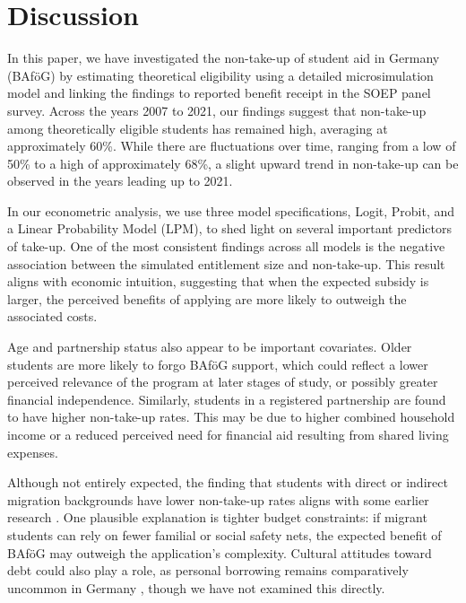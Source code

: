 \section{Discussion}

In this paper, we have investigated the non-take-up of student aid in Germany (BAföG) by estimating theoretical eligibility using a detailed microsimulation model and linking the findings to reported benefit receipt in the SOEP panel survey. Across the years 2007 to 2021, our findings suggest that non-take-up among theoretically eligible students has remained high, averaging at approximately 60\%. While there are fluctuations over time, ranging from a low of 50\% to a high of approximately 68\%, a slight upward trend in non-take-up can be observed in the years leading up to 2021.

In our econometric analysis, we use three model specifications, Logit, Probit, and a Linear Probability Model (LPM), to shed light on several important predictors of take-up. One of the most consistent findings across all models is the negative association between the simulated entitlement size and non-take-up. This result aligns with economic intuition, suggesting that when the expected subsidy is larger, the perceived benefits of applying are more likely to outweigh the associated costs.

Age and partnership status also appear to be important covariates. 
Older students are more likely to forgo BAföG support, which could reflect a lower perceived relevance of the program at later stages of study, or possibly greater financial independence. 
Similarly, students in a registered partnership are found to have higher non-take-up rates. 
This may be due to higher combined household income or a reduced perceived need for financial aid resulting from shared living expenses.


Although not entirely expected, the finding that students with direct or indirect migration backgrounds have lower non-take-up rates aligns with some earlier research \citep{herber_non-take-up_2019, konijn_quantifying_2023}. One plausible explanation is tighter budget constraints: if migrant students can rely on fewer familial or social safety nets, the expected benefit of BAföG may outweigh the application’s complexity. Cultural attitudes toward debt could also play a role, as personal borrowing remains comparatively uncommon in Germany \citep{seabrooke_germany_2017}, though we have not examined this directly. 


